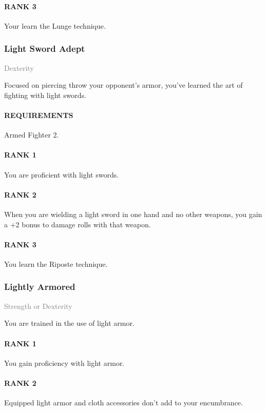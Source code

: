 \paragraph{RANK 3} Your learn the Lunge technique.

\subsubsection{Light Sword Adept} \label{feat::lightswordadept}
\small{\textcolor{gray}{Dexterity}}

\normalsize
Focused on piercing throw your opponent's armor, you've learned the art of fighting with light swords.
\paragraph{REQUIREMENTS} Armed Fighter 2.
\paragraph{RANK 1} You are proficient with light swords.
\paragraph{RANK 2} When you are wielding a light sword in one hand and no other weapons, you gain a +2 bonus to damage rolls with that weapon.
\paragraph{RANK 3} You learn the Riposte technique.

\subsubsection{Lightly Armored} \label{feat::lightlyarmored}
\small{\textcolor{gray}{Strength or Dexterity}}

\normalsize
You are trained in the use of light armor.
\paragraph{RANK 1} You gain proficiency with light armor.
\paragraph{RANK 2} Equipped light armor and cloth accessories don't add to your encumbrance.
